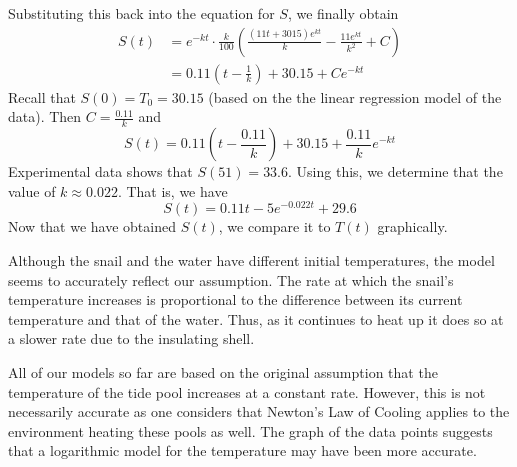 \documentclass{article}
\begin{document}
   Substituting this back into the equation for \(S\), we finally obtain
   \begin{align*}
     S(t) &= e^{-kt} \cdot \frac{k}{100} \left( \frac{(11t + 3015) e^{kt}}{k} - \frac{11 e^{kt}}{k^{2}} + C \right) \\
     &= 0.11 (t - \frac{1}{k}) + 30.15 + C e^{-kt}
   \end{align*}
   Recall that \(S(0) = T_{0} = 30.15\) (based on the the linear regression model of the data).
   Then \(C = \frac{0.11}{k}\) and
   \begin{equation*}
     S(t) = 0.11(t - \frac{0.11}{k}) + 30.15 + \frac{0.11}{k}e^{-kt}
   \end{equation*}
   Experimental data shows that \(S(51) = 33.6\). Using this, we determine that the value of \(k \approx 0.022\).
   That is, we have
   \begin{equation*}
     S(t) = 0.11t - 5e^{-0.022t} + 29.6
   \end{equation*}
   Now that we have obtained \(S(t)\), we compare it to \(T(t)\) graphically.
   \begin{center}
   \end{center}

   Although the snail and the water have different initial temperatures, the model seems to accurately reflect our assumption.
   The rate at which the snail's temperature increases is proportional to the difference between its current temperature and that of the water.
   Thus, as it continues to heat up it does so at a slower rate due to the insulating shell.

   All of our models so far are based on the original assumption that the temperature of the tide pool increases at a constant rate.
   However, this is not necessarily accurate as one considers that Newton's Law of Cooling applies to the environment heating these pools as well.
   The graph of the data points suggests that a logarithmic model for the temperature may have been more accurate.
\end{document}
